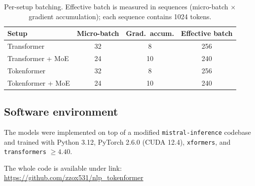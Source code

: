 \documentclass[twoside,11pt]{article}
\begin{document}
\begin{table}[h]
    \centering
    \begin{tabular}{|l|c|c|c|}
        \hline
        Setup & Micro-batch & Grad.\ accum. & Effective batch \\
        \hline\hline
        Transformer          & 32 & 8  & 256 \\
        \hline
        Transformer + MoE    & 24 & 10 & 240 \\
        \hline
        Tokenformer          & 32 & 8  & 256 \\
        \hline
        Tokenformer + MoE    & 24 & 10 & 240 \\
        \hline
    \end{tabular}
    \caption{Per-setup batching. Effective batch is measured in sequences
    (micro-batch $\times$ gradient accumulation); each sequence contains 1024
    tokens.}
    \label{tab:train}
\end{table}

\subsection{Software environment}

The models were implemented on top of a modified \texttt{mistral-inference}
codebase and trained with Python 3.12, PyTorch 2.6.0 (CUDA 12.4), \texttt{xformers},
and \texttt{transformers} $\geq 4.40$.

\noindent The whole code is available under link: \href{https://github.com/zzox531/nlp_tokenformer}{https://github.com/zzox531/nlp\_tokenformer}



        
\end{document}
